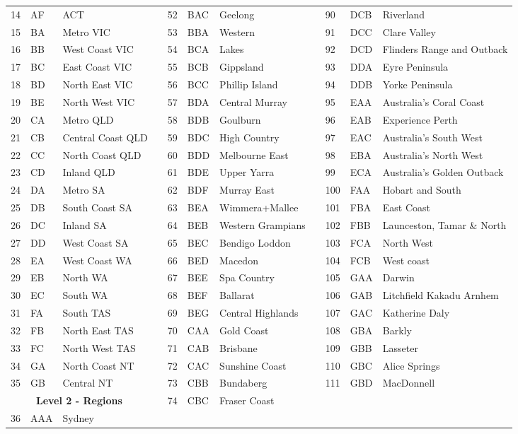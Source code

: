 \documentclass[12pt]{article}
\theoremstyle{definition}
\begin{document}
\begin{table}[!hb]
{\begin{tabular}{lllllllllll}
			14	& AF & ACT					&  &  52  & BAC & Geelong  && 90  & DCB & Riverland\\
			15	& BA & Metro VIC			&  &  53  & BBA & Western   &&91  & DCC & Clare Valley\\
			16	& BB & West Coast VIC		&  &  54  & BCA & Lakes  &&92  & DCD & Flinders Range and Outback\\
			17	& BC & East Coast VIC		&  &  55  & BCB & Gippsland    &&93  & DDA & Eyre Peninsula\\
			18	& BD & North East VIC		&  &  56  & BCC & Phillip Island   &&  94  & DDB & Yorke Peninsula \\
			19	& BE & North West VIC		&  &  57  & BDA & Central Murray    &&95  & EAA & Australia's Coral Coast\\
			20  & CA & Metro QLD			&  & 58  & BDB & Goulburn    &&96  & EAB & Experience Perth\\
			21  & CB & Central Coast QLD	&  & 59  & BDC & High Country   &&97  & EAC & Australia's South West\\
			22  & CC & North Coast QLD		&  &  60  & BDD & Melbourne East &&98  & EBA & Australia's North West \\
			23  & CD & Inland QLD			&  &   61  & BDE & Upper Yarra &&99  & ECA & Australia's Golden Outback\\
			24	& DA & Metro SA				&  & 62  & BDF & Murray East  && 100 & FAA & Hobart and South\\
			25	& DB & South Coast SA		&  &  63  & BEA & Wimmera+Mallee &&101 & FBA & East Coast\\
			26	& DC & Inland SA			&  & 64  & BEB & Western Grampians &&102 & FBB & Launceston, Tamar \& North\\
			27	& DD & West Coast SA		&  &65  & BEC & Bendigo Loddon  &&103 & FCA & North West\\
			
			28	& EA & West Coast WA 	& &  66  & BED & Macedon    &&104 & FCB& West coast\\
			29	& EB & North WA			& &  67  & BEE & Spa Country   &&105 & GAA& Darwin \\
			30	& EC & South WA 		& &   68  & BEF & Ballarat     &&106 & GAB& Litchfield Kakadu Arnhem\\
			31	& FA & South TAS		& &  69  & BEG & Central Highlands  &&107 & GAC& Katherine Daly\\
			32	& FB & North East TAS	& & 70  & CAA & Gold Coast  &&108 & GBA& Barkly\\
			33	& FC & North West TAS	& & 71  & CAB & Brisbane  &&109 & GBB& Lasseter\\
			34	& GA & North Coast NT	& & 72  & CAC & Sunshine Coast &&110 & GBC& Alice Springs\\
			35	& GB & Central NT		& &  73  & CBB & Bundaberg      &&111 & GBD& MacDonnell\\
			\cmidrule(lr){1-3}
			\multicolumn{3}{c}{\textbf{Level 2 - Regions}} & & 74  & CBC & Fraser Coast    &&\\
			\cmidrule(lr){1-3}
			36	& AAA & Sydney 			& 	&  &&\\
			

\end{tabular}}
\end{table}
\end{document}

